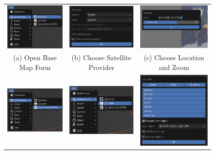 \begin{figure}[H]
\begin{tabular}{ccc}

\includegraphics[width=43mm]{src/img/manual-download/1-get-basemap.png} &
\includegraphics[width=43mm]{src/img/manual-download/2-choose-sat.png} &
\includegraphics[width=43mm]{src/img/manual-download/3-choose-gps-zoom.png} \\
  (a) Open Base Map Form &  
  (b) Choose Satellite Provider &   
  (c) Choose Location and Zoom \\
  \includegraphics[width=43mm]{src/img/manual-download/4-get-alt.png} &
  \includegraphics[width=43mm]{src/img/manual-download/5-get-osm.png} &
  \includegraphics[width=43mm]{src/img/manual-download/6-osm-settings.png} \\

\end{tabular}
\end{figure}
